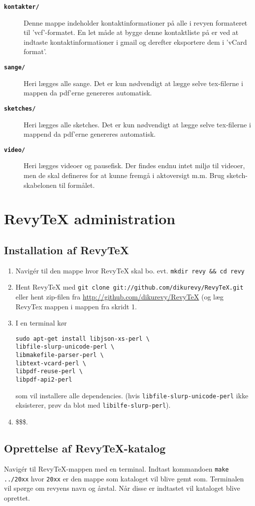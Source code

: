 \documentclass{article}
\newcommand{\fname}[1]{\textbf{\texttt{#1}}}
\newcommand{\shellcmd}[1]{\texttt{#1}}
\begin{document}
\begin{description}
\item[\fname{kontakter/}] Denne mappe indeholder kontaktinformationer på alle i
revyen formateret til 'vcf'-formatet. En let måde at bygge denne
kontaktliste på er ved at indtaste kontaktinformationer i gmail og
derefter eksportere dem i 'vCard format'.
\item[\fname{sange/}] Heri lægges alle sange. Det er kun nødvendigt at lægge
selve tex-filerne i mappen da pdf'erne genereres automatisk.
\item[\fname{sketches/}] Heri lægges alle sketches. Det er kun nødvendigt at
lægge selve tex-filerne i mappend da pdf'erne genereres automatisk.
\item[\fname{video/}] Heri lægges videoer og pausefisk. Der findes endnu intet
miljø til videoer, men de skal defineres for at kunne fremgå i
aktoversigt m.m. Brug sketch-skabelonen til formålet.
\end{description}

\section{RevyTeX administration}
\subsection{Installation af RevyTeX}
\begin{enumerate}
\item Navigér til den mappe hvor RevyTeX skal bo. evt. \shellcmd{mkdir
revy \&\& cd revy}
\item Hent RevyTeX med \shellcmd{git clone
git://github.com/dikurevy/RevyTeX.git} eller hent zip-filen fra
\url{http://github.com/dikurevy/RevyTeX} (og læg RevyTex mappen i mappen
fra skridt 1.
\item I en terminal kør 
\begin{verbatim}
sudo apt-get install libjson-xs-perl \
libfile-slurp-unicode-perl \
libmakefile-parser-perl \
libtext-vcard-perl \
libpdf-reuse-perl \
libpdf-api2-perl
\end{verbatim} som vil installere alle
dependencies. (hvis \shellcmd{libfile-slurp-unicode-perl} ikke
eksisterer, prøv da blot med \shellcmd{libilfe-slurp-perl}).
\item \$\$\$.
\end{enumerate}

\subsection{Oprettelse af RevyTeX-katalog}
Navigér til RevyTeX-mappen med en terminal. Indtast kommandoen \shellcmd{make
../20xx} hvor \texttt{20xx} er den mappe som kataloget vil blive gemt som.
Terminalen vil spørge om revyens navn og årstal. Når disse er indtastet
vil kataloget blive oprettet.
\end{document}
